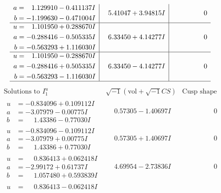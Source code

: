 \documentclass[1p]{elsarticle_modified}
\theoremstyle{definition}
\newcommand{\I}{\sqrt{-1}}
\begin{document}
$$\begin{array}{c|c|c}
\begin{aligned}
a &= \phantom{-}1.129910 - 0.411137 I \\
b &= -1.199630 - 0.471004 I\end{aligned}
 & \phantom{-}5.41047 + 3.94815 I & \phantom{-0.000000 } 0 \\ \hline\begin{aligned}
u &= \phantom{-}1.101950 + 0.288670 I \\
a &= -0.288416 - 0.505335 I \\
b &= -0.563293 + 1.116030 I\end{aligned}
 & \phantom{-}6.33450 + 4.14277 I & \phantom{-0.000000 } 0 \\ \hline\begin{aligned}
u &= \phantom{-}1.101950 - 0.288670 I \\
a &= -0.288416 + 0.505335 I \\
b &= -0.563293 - 1.116030 I\end{aligned}
 & \phantom{-}6.33450 - 4.14277 I & \phantom{-0.000000 } 0\\
 \hline 
 \end{array}$$\newpage$$\begin{array}{c|c|c}  
\text{Solutions to }I^u_{1}& \I (\text{vol} + \sqrt{-1}CS) & \text{Cusp shape}\\
 \hline 
\begin{aligned}
u &= -0.834096 + 0.109112 I \\
a &= -3.07979 - 0.00775 I \\
b &= \phantom{-}1.43386 - 0.77030 I\end{aligned}
 & \phantom{-}0.57305 - 1.40697 I & \phantom{-0.000000 } 0 \\ \hline\begin{aligned}
u &= -0.834096 - 0.109112 I \\
a &= -3.07979 + 0.00775 I \\
b &= \phantom{-}1.43386 + 0.77030 I\end{aligned}
 & \phantom{-}0.57305 + 1.40697 I & \phantom{-0.000000 } 0 \\ \hline\begin{aligned}
u &= \phantom{-}0.836413 + 0.062418 I \\
a &= -2.99172 + 0.61737 I \\
b &= \phantom{-}1.057480 + 0.593839 I\end{aligned}
 & \phantom{-}4.69954 - 2.73836 I & \phantom{-0.000000 } 0 \\ \hline\begin{aligned}
u &= \phantom{-}0.836413 - 0.062418 I \\

\end{aligned}
\end{array}$$
\end{document}
